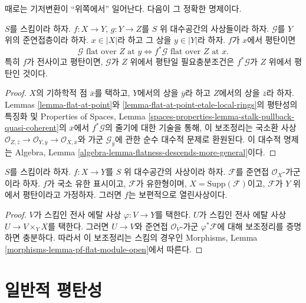 \noindent
때로는 기저변환이 ``위쪽에서'' 일어난다. 다음이 그 정확한 명제이다.

\begin{lemma}
\label{lemma-flat-permanence}
$S$를 스킴이라 하자. $f : X \to Y$, $g : Y \to Z$를
$S$ 위 대수공간의 사상들이라 하자. $\mathcal{G}$를 $Y$ 위의
준연접층이라 하자. $x \in |X|$라 하고 그 상을 $y \in |Y|$라 하자.
$f$가 $x$에서 평탄이면
$$
\mathcal{G}\text{ flat over }Z\text{ at }y
\Leftrightarrow
f^*\mathcal{G}\text{ flat over }Z\text{ at }x.
$$
특히 $f$가 전사이고 평탄이면, $\mathcal{G}$가 $Z$ 위에서 평탄일
필요충분조건은 $f^*\mathcal{G}$가 $Z$ 위에서 평탄인 것이다.
\end{lemma}

\begin{proof}
$X$의 기하학적 점 $\overline{x}$를 택하고, $Y$에서의 상을
$\overline{y}$라 하고 $Z$에서의 상을 $\overline{z}$라 하자.
Lemmas \ref{lemma-flat-at-point}와
\ref{lemma-flat-at-point-etale-local-rings}의 평탄성의 특징화 및
Properties of Spaces, Lemma
\ref{spaces-properties-lemma-stalk-pullback-quasi-coherent}의
$\overline{x}$에서 $f^*\mathcal{G}$의 줄기에 대한 기술을 통해,
이 보조정리는 국소환 사상
$\mathcal{O}_{Z, \overline{z}} \to \mathcal{O}_{Y, \overline{y}}
\to \mathcal{O}_{X, \overline{x}}$와 가군
$\mathcal{G}_{\overline{y}}$에 관한 순수 대수적 문제로 환원된다.
이 대수적 명제는 Algebra, Lemma
\ref{algebra-lemma-flatness-descends-more-general}이다.
\end{proof}

\begin{lemma}
\label{lemma-pf-flat-module-open}
$S$를 스킴이라 하자.
$f : X \to Y$를 $S$ 위 대수공간의 사상이라 하자.
$\mathcal{F}$를 준연접 $\mathcal{O}_X$-가군이라 하자.
$f$가 국소 유한 표시이고, $\mathcal{F}$가 유한형이며,
$X = \text{Supp}(\mathcal{F})$이고, $\mathcal{F}$가 $Y$ 위에서
평탄이라고 가정하자. 그러면 $f$는 보편적으로 열린사상이다.
\end{lemma}

\begin{proof}
$V$가 스킴인 전사 에탈 사상 $\varphi : V \to Y$를 택한다.
$U$가 스킴인 전사 에탈 사상 $U \to V \times_Y X$를 택한다.
그러면 $U \to V$와 준연접 $\mathcal{O}_V$-가군
$\varphi^*\mathcal{F}$에 대해 보조정리를 증명하면 충분하다.
따라서 이 보조정리는 스킴의 경우인 Morphisms, Lemma
\ref{morphisms-lemma-pf-flat-module-open}에서 따른다.
\end{proof}






\section{일반적 평탄성}
\label{section-generic-flatness}

